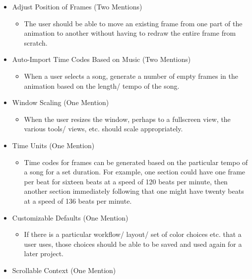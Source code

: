 \documentclass[12pt]{extarticle}
\begin{document}
{\begin{itemize}
	\begin{itemize}
		\item A dedicated view/ window displays the playback of the frames as it would appear on the actual tower. This feature could possibly include playback of the music as well, in conjunction with the changing color values so that the entire effect can be previewed.
	\end{itemize}
	\item Adjust Position of Frames (Two Mentions)
	\begin{itemize}
		\item The user should be able to move an existing frame from one part of the animation to another without having to redraw the entire frame from scratch.
	\end{itemize}
	\item Auto-Import Time Codes Based on Music (Two Mentions)
	\begin{itemize}
		\item When a user selects a song, generate a number of empty frames in the animation based on the length/ tempo of the song.
	\end{itemize}
	\item Window Scaling (One Mention)
	\begin{itemize}
		\item When the user resizes the window, perhaps to a fullscreen view, the various tools/ views, etc. should scale appropriately.
	\end{itemize}
	\item Time Units (One Mention)
	\begin{itemize}
		\item Time codes for frames can be generated based on the particular tempo of a song for a set duration. For example, one section could have one frame per beat for sixteen beats at a speed of 120 beats per minute, then another section immediately following that one might have twenty beats at a speed of 136 beats per minute.
	\end{itemize}
	\item Customizable Defaults (One Mention)
	\begin{itemize}
		\item If there is a particular workflow/ layout/ set of color choices etc. that a user uses, those choices should be able to be saved and used again for a later project.
	\end{itemize}
	\item Scrollable Context (One Mention)
	\begin{itemize}

\end{itemize}
\end{itemize}}
\end{document}
